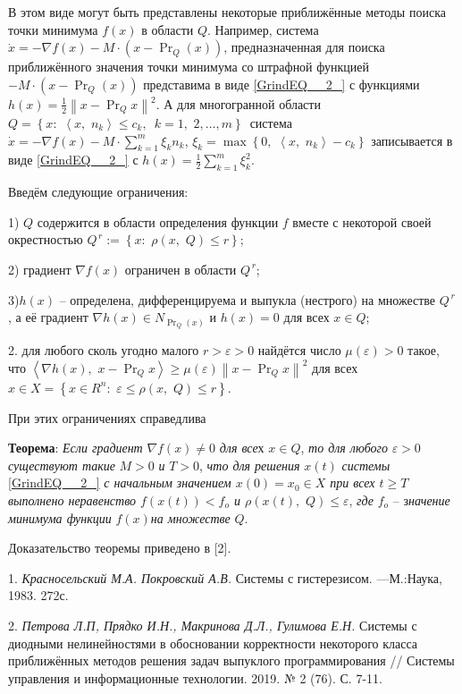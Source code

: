 В этом виде могут быть представлены некоторые приближённые методы поиска точки минимума $f\left(x\right)$ в области $Q$. Например, система $\dot{x}=-\nabla f\left(x\right)-M\cdot \left(x-\Pr _{Q} \left(x\right)\right)$, предназначенная для поиска приближённого значения точки минимума со штрафной функцией $-M\cdot \left(x-\Pr _{Q} \left(x\right)\right)$ представима в виде \eqref{GrindEQ__2_} с функциями $h\left(x\right)=\frac{1}{2} \left\| x-\Pr _{Q} x\right\| ^{2} $. А для многогранной области $Q=\left\{x:\, \, \left\langle x,\, \, n_{k} \right\rangle \le c_{k} ,\, \, \, k=1,\, \, 2,\ldots ,m\right\}\, $ система $\dot{x}=-\nabla f\left(x\right)-M\cdot \sum _{k=1}^{m}\xi _{k} n_{k}  $, $\xi _{k} =\max \left\{0,\, \, \left\langle x,\, \, n_{k} \right\rangle -c_{k} \right\}$ записывается в виде \eqref{GrindEQ__2_} с $h\left(x\right)=\frac{1}{2} \sum _{k=1}^{m}\xi _{k}^{2}  $.

 Введём следующие ограничения:

1) $Q$ содержится в области определения функции $f$ вместе с некоторой своей окрестностью $Q^{\, r} :=\left\{x:\, \, \rho \left(x,\, \, Q\right)\le r\right\}$;

2) градиент $\nabla f\left(x\right)$ ограничен в области $Q^{\, r} $;

3)$h\left(x\right)$ -- определена, дифференцируема и выпукла (нестрого) на множестве \textit{$Q^{\, r} $}, а её градиент $\nabla h\left(x\right)\in N_{\Pr _{Q} \left(x\right)} $ и $h\left(x\right)=0$ для всех $x\in Q$;

2. для любого сколь угодно малого \textit{$r>\varepsilon >0$} найдётся число $\mu \left(\varepsilon \right)>0$ такое, что $\left\langle \nabla h\left(x\right),\, \, x-\Pr _{Q} x\right\rangle \ge \mu \left(\varepsilon \right)\left\| x-\Pr _{Q} x\right\| ^{2} $ для всех $x\in X=\left\{x\in R^{n} :\, \, \varepsilon \le \rho \left(x,\, \, Q\right)\le r\right\}$.

При этих ограничениях справедлива

\textbf{Теорема}: \textit{Если градиент }$\nabla f\left(x\right)\ne 0$\textit{ для все}х $x\in Q$, \textit{то для любого }$\varepsilon >0$\textit{ существуют такие }$M>0$\textit{ и }$T>0$, \textit{что для решения }$x\left(t\right)$\textit{ системы }\eqref{GrindEQ__2_}\textit{ с начальным значением $x\left(0\right)=x_{0} \in X$ при всех $t\ge T$ выполнено неравенство $f\left(x\left(t\right)\right)<f_{o} $ и $\rho \left(x\left(t\right),\, \, Q\right)\le \varepsilon $}, \textit{где }$f_{o} $ -- з\textit{начение минимума функции }$f\left(x\right)$\textit{на множестве }$Q$.

 Доказательство теоремы приведено в [2].

\litlist

1.
{\it Красносельский М.А. Покровский А.В.} Системы с гистерезисом. ---М.:Наука, 1983. 272с.

2.
{\it  Петрова Л.П, Прядко И.Н., Макринова Д.Л., Гулимова Е.Н.} Системы с диодными нелинейностями в обосновании корректности некоторого класса приближённых методов решения задач выпуклого программирования  // Системы управления и информационные технологии. 2019. № 2 (76). С. 7-11.


